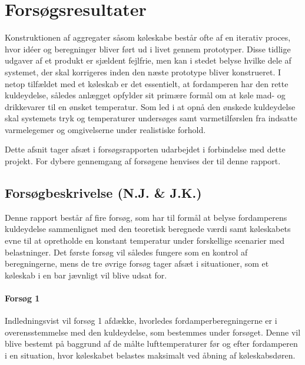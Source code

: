 \documentclass[../Hovedrapport.tex]{subfiles}
\begin{document}
\chapter{Forsøgsresultater}
    \label{chap:Forsøg}
        \vspace{-30pt}
Konstruktionen af aggregater såsom køleskabe består ofte af en iterativ proces, hvor idéer og beregninger bliver ført ud i livet gennem prototyper. Disse tidlige udgaver af et produkt er sjældent fejlfrie, men kan i stedet belyse hvilke dele af systemet, der skal korrigeres inden den næste prototype bliver konstrueret. I netop tilfældet med et køleskab er det essentielt, at fordamperen har den rette kuldeydelse, således anlægget opfylder sit primære formål om at køle mad- og drikkevarer til en ønsket temperatur. Som led i at opnå den ønskede kuldeydelse skal systemets tryk og temperaturer undersøges samt varmetilførslen fra indsatte varmelegemer og omgivelserne under realistiske forhold.   

Dette afsnit tager afsæt i forsøgsrapporten udarbejdet i forbindelse med dette projekt. For dybere gennemgang af forsøgene henvises der til denne rapport. 

\section{Forsøgbeskrivelse (N.J. \& J.K.)}

Denne rapport består af fire forsøg, som har til formål at belyse fordamperens kuldeydelse sammenlignet med den teoretisk beregnede værdi samt køleskabets evne til at opretholde en konstant temperatur under forskellige scenarier med belastninger. Det første forsøg vil således fungere som en kontrol af beregningerne, mens de tre øvrige forsøg tager afsæt i situationer, som et køleskab i en bar jævnligt vil blive udsat for. 

\subsubsection*{Forsøg 1}
Indledningsvist vil forsøg 1 afdække, hvorledes fordamperberegningerne er i overensstemmelse med den kuldeydelse, som bestemmes under forsøget. Denne vil blive bestemt på baggrund af de målte lufttemperaturer før og efter fordamperen i en situation, hvor køleskabet belastes maksimalt ved åbning af køleskabsdøren. 
\end{document}
